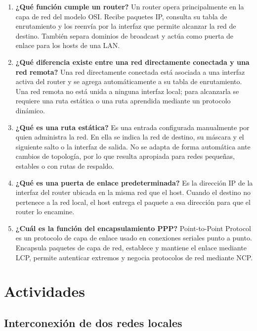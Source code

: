 \documentclass[a4paper,12pt]{article}
\begin{document}
\begin{enumerate}[label=\arabic*.]
    \item \textbf{¿Qué función cumple un router?} Un router opera principalmente en la capa de red del modelo OSI. Recibe paquetes IP, consulta su tabla de enrutamiento y los reenvía por la interfaz que permite alcanzar la red de destino. También separa dominios de broadcast y actúa como puerta de enlace para los hosts de una LAN.

    \item \textbf{¿Qué diferencia existe entre una red directamente conectada y una red remota?} Una red directamente conectada está asociada a una interfaz activa del router y se agrega automáticamente a su tabla de enrutamiento. Una red remota no está unida a ninguna interfaz local; para alcanzarla se requiere una ruta estática o una ruta aprendida mediante un protocolo dinámico.

    \item \textbf{¿Qué es una ruta estática?} Es una entrada configurada manualmente por quien administra la red. En ella se indica la red de destino, su máscara y el siguiente salto o la interfaz de salida. No se adapta de forma automática ante cambios de topología, por lo que resulta apropiada para redes pequeñas, estables o con rutas de respaldo.

    \item \textbf{¿Qué es una puerta de enlace predeterminada?} Es la dirección IP de la interfaz del router ubicada en la misma red que el host. Cuando el destino no pertenece a la red local, el host entrega el paquete a esa dirección para que el router lo encamine.

    \item \textbf{¿Cuál es la función del encapsulamiento PPP?} Point-to-Point Protocol es un protocolo de capa de enlace usado en conexiones seriales punto a punto. Encapsula paquetes de capa de red, establece y mantiene el enlace mediante LCP, permite autenticar extremos y negocia protocolos de red mediante NCP.
\end{enumerate}

\section{Actividades}

\subsection*{Interconexión de dos redes locales}
\end{document}

